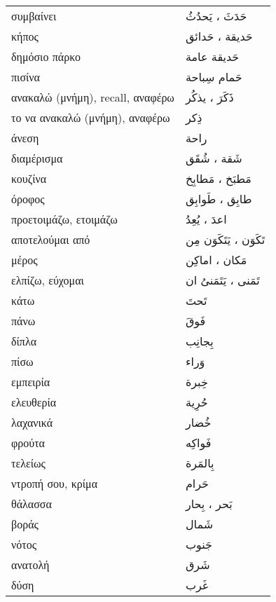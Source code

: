 \documentclass[twocolumn,a4paper]{article}
\newcommand{\ar}[1]{\textarabic{#1}}
\newcommand{\pl}{\raisebox{0.15ex}{\footnotesize ◍}}
\newcommand{\vrf}{\raisebox{0.15ex}{\footnotesize ◉}}
\newcommand{\mas}{\raisebox{0.15ex}{\footnotesize ◫}}
\begin{document}
\begin{mpsupertabular}{ P{0.5\textwidth} P{0.5\textwidth} }
συμβαίνει \vrf               & \ar{ حَدَثَ ، يَحدُثُ } \\
κήπος \pl                    & \ar{ حَديقة ، حَدائق } \\
δημόσιο πάρκο                & \ar{ حَديقة عامة } \\
πισίνα                       & \ar{ حَمام سِباحة } \\
ανακαλώ (μνήμη), recall, αναφέρω \vrf  & \ar{ ذَكَرَ ، يذكُر } \\
το να ανακαλώ (μνήμη), αναφέρω \mas    & \ar{ ذِكر } \\
άνεση                        & \ar{ راحة } \\
διαμέρισμα \pl               & \ar{ شَقة ، شُقَق} \\
κουζίνα \pl                  & \ar{ مَطبَخ ، مَطابِخ } \\
όροφος \pl                   & \ar{ طابِق ، طَوابِق } \\
προετοιμάζω, ετοιμάζω \vrf   & \ar{ اعدَ ، يُعِدُ } \\
αποτελούμαι από \vrf         & \ar{ تَكَوَن ، يَتَكَوَن مِن } \\
μέρος \pl                    & \ar{ مَكان ، اماكِن } \\
ελπίζω, εύχομαι \vrf         & \ar{ تَمَنى ، يَتَمَنىُ ان } \\
κάτω                         & \ar{ تَحتَ } \\
πάνω                         & \ar{ فَوقَ } \\
δίπλα                        & \ar{ بِجانِب } \\
πίσω                         & \ar{ وَراء } \\
εμπειρία                     & \ar{ خِبرة } \\
ελευθερία                    & \ar{ حُرِية } \\
λαχανικά                     & \ar{ خُضار } \\
φρούτα                       & \ar{ فَواكِه } \\
τελείως                      & \ar{ بِالمَرة } \\
ντροπή σου, κρίμα            & \ar{ حَرام } \\
θάλασσα \pl                  & \ar{ بَحر ، بِحار } \\
βοράς                        & \ar{ شَمال } \\
νότος                        & \ar{ جَنوب } \\
ανατολή                      & \ar{ شَرق } \\
δύση                         & \ar{ غَرب } \\

\end{mpsupertabular}
\end{document}
